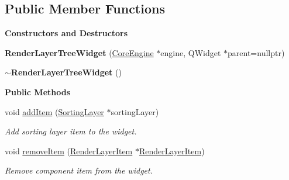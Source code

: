 \subsection*{Public Member Functions}
\begin{Indent}\textbf{ Constructors and Destructors}\par
\begin{DoxyCompactItemize}
\item 
\mbox{\label{classrev_1_1_view_1_1_render_layer_tree_widget_a89634d9c5c970fbc12e7e38de0630d19}} 
{\bfseries Render\+Layer\+Tree\+Widget} (\mbox{\hyperlink{classrev_1_1_core_engine}{Core\+Engine}} $\ast$engine, Q\+Widget $\ast$parent=nullptr)
\item 
\mbox{\label{classrev_1_1_view_1_1_render_layer_tree_widget_a56aab6d5ac32992a3d1084c26b5217b2}} 
{\bfseries $\sim$\+Render\+Layer\+Tree\+Widget} ()
\end{DoxyCompactItemize}
\end{Indent}
\begin{Indent}\textbf{ Public Methods}\par
\begin{DoxyCompactItemize}
\item 
\mbox{\label{classrev_1_1_view_1_1_render_layer_tree_widget_a09c9d412902db73b2ec6a62c12824a0d}} 
void \mbox{\hyperlink{classrev_1_1_view_1_1_render_layer_tree_widget_a09c9d412902db73b2ec6a62c12824a0d}{add\+Item}} (\mbox{\hyperlink{structrev_1_1_sorting_layer}{Sorting\+Layer}} $\ast$sorting\+Layer)
\begin{DoxyCompactList}\small\item\em Add sorting layer item to the widget. \end{DoxyCompactList}\item 
\mbox{\label{classrev_1_1_view_1_1_render_layer_tree_widget_ab2e1c19a005640e864b3f6282330f95d}} 
void \mbox{\hyperlink{classrev_1_1_view_1_1_render_layer_tree_widget_ab2e1c19a005640e864b3f6282330f95d}{remove\+Item}} (\mbox{\hyperlink{classrev_1_1_view_1_1_render_layer_item}{Render\+Layer\+Item}} $\ast$\mbox{\hyperlink{classrev_1_1_view_1_1_render_layer_item}{Render\+Layer\+Item}})
\begin{DoxyCompactList}\small\item\em Remove component item from the widget. \end{DoxyCompactList}\end{DoxyCompactItemize}
\end{Indent}
